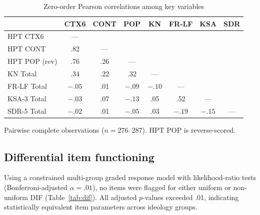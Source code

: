 \documentclass[pdflatex,sn-apa]{sn-jnl}%
\begin{document}
\begin{table}[ht]
\caption{Zero-order Pearson correlations among key variables}\label{tab:correlations}
\begin{tabular*}{\textwidth}{@{\extracolsep\fill}lccccccc}
\toprule
 & CTX6 & CONT & POP & KN & FR-LF & KSA & SDR \\
\midrule
HPT CTX6 & --- & & & & & & \\
HPT CONT & .82 & --- & & & & & \\
HPT POP (rev) & .76 & .26 & --- & & & & \\
KN Total & .34 & .22 & .32 & --- & & & \\
FR-LF Total & $-.05$ & .01 & $-.09$ & $-.10$ & --- & & \\
KSA-3 Total & $-.03$ & .07 & $-.13$ & .05 & .52 & --- & \\
SDR-5 Total & $-.02$ & .01 & $-.05$ & .03 & $-.19$ & $-.15$ & --- \\
\bottomrule
\end{tabular*}
\begin{tablenotes}
\small
\item Pairwise complete observations ($n = 276$--287). HPT POP is reverse-scored.
\end{tablenotes}
\end{table}

\subsection{Differential item functioning}\label{subsec:dif}

Using a constrained multi-group graded response model with likelihood-ratio tests (Bonferroni-adjusted $\alpha = .01$), no items were flagged for either uniform or non-uniform DIF (Table~\ref{tab:dif}). All adjusted $p$-values exceeded .01, indicating statistically equivalent item parameters across ideology groups.
\end{document}
